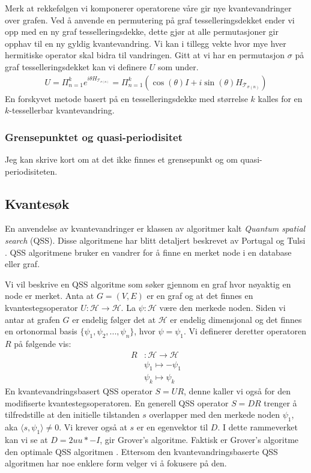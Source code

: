         Merk at rekkefølgen vi komponerer operatorene våre gir nye kvantevandringer over grafen. Ved å anvende en permutering på graf tesselleringsdekket ender vi opp med en ny graf tesselleringsdekke, dette gjør at alle permutasjoner gir opphav til en ny gyldig kvantevandring. Vi kan i tillegg vekte hvor mye hver hermitiske operator skal bidra til vandringen. Gitt at vi har en permutasjon $\sigma$ på graf tesselleringsdekket kan vi definere $U$ som under.
        \begin{align*}
            U=\Pi_{n=1}^ke^{i\theta H_{\mathcal{T}_{\sigma(n)}}}=\Pi_{n=1}^k(\cos(\theta)I+i\sin(\theta)H_{\mathcal{T}_{\sigma(n)}})
        \end{align*}
        En forskyvet metode basert på en tesselleringsdekke med størrelse $k$ kalles for en $k$-tessellerbar kvantevandring.

    \subsubsection{Grensepunktet og quasi-periodisitet}

        Jeg kan skrive kort om at det ikke finnes et grensepunkt og om quasi-periodisiteten.
        

\subsection{Kvantesøk}

        En anvendelse av kvantevandringer er klassen av algoritmer kalt \emph{Quantum spatial search} (QSS). Disse algoritmene har blitt detaljert beskrevet av Portugal \cite{portugal_2019} og Tulsi \cite{PhysRevA.86.042331}. QSS algoritmene bruker en vandrer for å finne en merket node i en database eller graf.

        Vi vil beskrive en QSS algoritme som søker gjennom en graf hvor nøyaktig en node er merket. Anta at $G=(V,E)$ er en graf og at det finnes en kvantestegsoperator $U:\mathcal{H}\rightarrow\mathcal{H}$. La $\psi:\mathcal{H}$ være den merkede noden. Siden vi antar at grafen $G$ er endelig følger det at $\mathcal{H}$ er endelig dimensjonal og det finnes en ortonormal basis $\{\psi_1, \psi_2, ..., \psi_n\}$, hvor $\psi=\psi_1$. Vi definerer deretter operatoren $R$ på følgende vis:
        \begin{align*}
            R & :\mathcal{H}\rightarrow\mathcal{H} \\
            & \psi_1 \mapsto -\psi_1 \\
            &\psi_k \mapsto \psi_k
        \end{align*}
        En kvantevandringsbasert QSS operator $S=UR$, denne kaller vi også for den modifiserte kvantestegsoperatoren. En generell QSS operator $S=DR$ trenger å tilfredstille at den initielle tilstanden $s$ overlapper med den merkede noden $\psi_1$, aka $\langle s,\psi_1\rangle\neq 0$. Vi krever også at $s$ er en egenvektor til $D$. I dette rammeverket kan vi se at $D=2uu*-I$, gir Grover's algoritme. Faktisk er Grover's algoritme den optimale QSS algoritmen \cite{Zalka_1999}. Ettersom den kvantevandringsbaserte QSS algoritmen har noe enklere form velger vi å fokusere på den.
        
